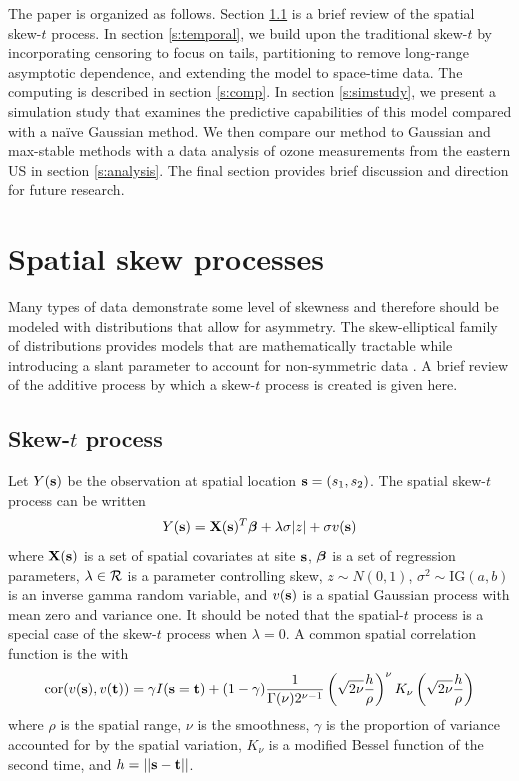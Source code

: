 \documentclass[11pt]{article}
\begin{document}
The paper is organized as follows.
Section \ref{s:skewt} is a brief review of the spatial skew-$t$ process.
In section \ref{s:temporal}, we build upon the traditional skew-$t$ by incorporating censoring to focus on tails, partitioning to remove long-range asymptotic dependence, and extending the model to space-time data.
The computing is described in section \ref{s:comp}.
In section \ref{s:simstudy}, we present a simulation study that examines the predictive capabilities of this model compared with a na{\"i}ve Gaussian method.
We then compare our method to Gaussian and max-stable methods with a data analysis of ozone measurements from the eastern US in section \ref{s:analysis}.
The final section provides brief discussion and direction for future research.

\section{Spatial skew processes}\label{s:spatialskew}
Many types of data demonstrate some level of skewness and therefore should be modeled with distributions that allow for asymmetry.
The skew-elliptical family of distributions provides models that are mathematically tractable while introducing a slant parameter to account for non-symmetric data \citep{Genton2004}.
A brief review of the additive process by which a skew-$t$ process is created is given here.

\subsection{Skew-$t$ process} \label{s:skewt}
Let $Y(\mbox{\bf s})$ be the observation at spatial location $\mbox{\bf s} = (s_1, s_2)$.
The spatial skew-$t$ process can be written
\begin{align}
  Y(\mbox{\bf s}) = \mbox{\bf X}(\mbox{\bf s})^T \mbox{\boldmath $\beta$} + \lambda \sigma |z| + \sigma v(\mbox{\bf s})
\end{align}
where $\mbox{\bf X}(\mbox{\bf s})$ is a set of spatial covariates at site $\mbox{\bf s}$, $\mbox{\boldmath $\beta$}$ is a set of regression parameters, $\lambda \in {\cal R}$ is a parameter controlling skew, $z \sim N(0, 1)$, $\sigma^2 \sim \text{IG}(a, b)$ is an inverse gamma random variable, and $v(\mbox{\bf s})$ is a spatial Gaussian process with mean zero and variance one.
It should be noted that the spatial-$t$ process is a special case of the skew-$t$ process when $\lambda = 0$.
A common spatial correlation function is the \Matern with
\begin{align}
  \text{cor}(v(\mbox{\bf s}), v(\mbox{\bf t})) = \gamma I(\mbox{\bf s} = \mbox{\bf t}) + (1 - \gamma)  \frac{ 1 }{ \Gamma(\nu) 2^{ \nu - 1}} \left( \sqrt{2\nu} \frac{ h }{ \rho } \right)^{\nu} K_{\nu} \left( \sqrt{2\nu} \frac{ h }{ \rho } \right) \label{eq:matern}
\end{align}
where $\rho$ is the spatial range, $\nu$ is the smoothness, $\gamma$ is the proportion of variance accounted for by the spatial variation, $K_\nu$ is a modified Bessel function of the second time, and $h = || \mbox{\bf s} - \mbox{\bf t} ||$.
\end{document}
